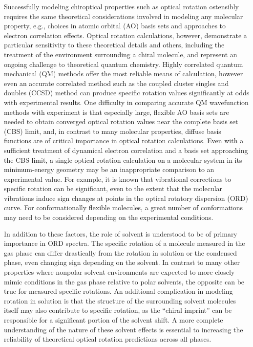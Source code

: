 Successfully modeling chiroptical properties such as optical rotation
ostensibly requires the same
theoretical considerations involved in modeling any molecular property,
e.g., choices in atomic orbital (AO) basis sets and approaches to electron
correlation effects. Optical rotation calculations, however, demonstrate
a particular sensitivity to these theoretical details and others,
including the treatment of
the environment surrounding a chiral molecule, and represent an ongoing challenge
to theoretical quantum chemistry.\cite{Crawford:06,Srebro:17,Crawford:18}
Highly correlated quantum mechanical
(QM) methods\cite{Shavitt:09,Crawford:00,Helgaker:12} offer the most reliable means of calculation, however
even an accurate correlated
method such as the coupled cluster singles and doubles (CCSD) method
can produce specific rotation values significantly at odds with experimental
results.
One difficulty in comparing accurate QM wavefunction methods with
experiment is that especially large, flexible AO basis sets
are needed to obtain converged optical rotation values near the complete basis
set (CBS) limit,\cite{Mach:11,Baranowska:13,Haghdani:16} and, in contrast to many
molecular properties,\cite{Papajak:11} diffuse basis functions are of
critical importance in optical rotation calculations.\cite{Baranowska:10,
Mach:11,Wiberg:13}
Even with a sufficient treatment of dynamical electron correlation and a basis set
approaching the CBS limit, a single optical rotation calculation on
a molecular system in its minimum-energy geometry may be an inappropriate 
comparison to an experimental value. For example, it is known that
vibrational corrections to specific rotation can be significant,\cite{Ruud:01,
Ruud:05,Mort:05,Kongsted:08,Pedersen:09,Pedersen:09b} even to the
extent that the molecular vibrations induce sign changes at points in the optical
rotatory dispersion (ORD) curve.\cite{Ruud:05}
For conformationally flexible molecules, a great number of conformations
may need to be considered
depending on the experimental conditions.\cite{Wiberg:03,Wiberg:05,
Lambert:12,Pearce:17}

In addition to these factors, the role of solvent is understood to be
of primary importance in ORD spectra.\cite{Kumata:70,Berova:00}
The specific rotation of a molecule measured in the gas phase can differ
drastically from the rotation in solution or the condensed phase,
even changing sign depending on the solvent.\cite{Kumata:70,Wilson:05}
In contrast to many other properties where nonpolar solvent environments
are expected to more closely mimic conditions in the gas phase
relative to polar solvents, the opposite can be true for measured specific
rotations.\cite{Wilson:05} An additional complication in modeling
rotation in solution is that the structure of the surrounding solvent molecules
itself may also contribute to specific rotation, as the ``chiral
imprint'' can be responsible for a significant portion of the solvent
shift.\cite{Beratan:06,Beratan:07} A more complete understanding of the
nature of these solvent effects 
is essential to increasing the reliability of theoretical
optical rotation predictions across all phases.

